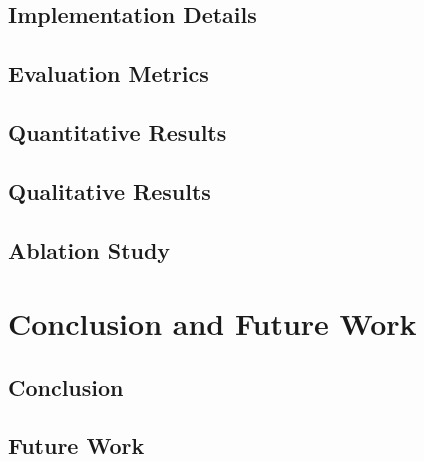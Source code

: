 \documentclass{ipgpmaster}
\begin{document}
\subsection{Implementation Details}

\subsection{Evaluation Metrics}

\subsection{Quantitative Results}

\subsection{Qualitative Results}

\subsection{Ablation Study}


\newpage
\section{Conclusion and Future Work}

\subsection{Conclusion}

\subsection{Future Work}
\end{document}
